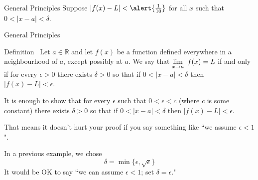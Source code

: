 
\begin{frame}[t]{General Principles}
Suppose $|f(x)-L|<\alert{\frac{1}{10}}$ for all $x$ such that $0<|x-a|<\delta$.\\

\begin{center}
\end{center}

\vfill\hfill \hyperlink{endWLOG}{}
\end{frame}

\begin{frame}[t]{General Principles}
\begin{block}{Definition~}
 Let $a \in \mathbb{R}$ and let $f(x)$ be a function defined everywhere in a
neighbourhood of $a$, except possibly at $a$. We say that
$  \displaystyle\lim_{x \to a}~ f(x) = L$
if and only if \alert{for every $\epsilon >0$} there exists $\delta>0$ so that
if $0<|x-a| < \delta$ then $|f(x) - L| <\epsilon$.
\end{block}\pause

It is enough to show that \alert{for every $\epsilon$ such that $0<\epsilon<c$} (where $c$ is some constant) there exists $\delta>0$ so that
if $0<|x-a| < \delta$ then $|f(x) - L| <\epsilon$.\vfill

That means it doesn't hurt your proof if you say something like ``we assume $\epsilon < 1$".\pause\vfill

In a previous example, we chose
\[\delta = \min\{\epsilon, \sqrt \epsilon\}\]
It would be OK to say ``we can assume $\epsilon<1$; set $\delta = \epsilon$."

\end{frame}

